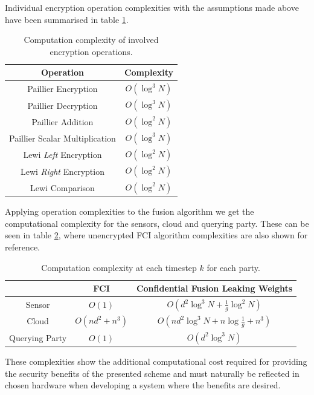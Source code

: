 Individual encryption operation complexities with the assumptions made above have been summarised in table \ref{tab:cloud_fusion:secfci_op_complexity}. 
\begin{table}[htbp]
    \centering
    \caption{Computation complexity of involved encryption operations.}
    \label{tab:cloud_fusion:secfci_op_complexity}
    \begin{tabular}{|c|c|}
        \hline
        \textbf{Operation} & \textbf{Complexity} \\ 
        \hline
        Paillier Encryption & $O(\log^3{N})$ \\ 
        Paillier Decryption & $O(\log^3{N})$ \\ 
        Paillier Addition & $O(\log^2{N})$ \\ 
        Paillier Scalar Multiplication & $O(\log^3{N})$ \\ 
        Lewi \textit{Left} Encryption & $O(\log^2{N})$ \\ 
        Lewi \textit{Right} Encryption & $O(\log^2{N})$ \\ 
        Lewi Comparison & $O(\log^2{N})$ \\ 
        \hline
    \end{tabular}
\end{table}
Applying operation complexities to the fusion algorithm we get the computational complexity for the sensors, cloud and querying party. These can be seen in table \ref{tab:cloud_fusion:secfci_complexity}, where unencrypted FCI algorithm complexities are also shown for reference. 
\begin{table}[htbp]
   \centering
   \caption{Computation complexity at each timestep $k$ for each party.}
   \label{tab:cloud_fusion:secfci_complexity}
   \begin{tabular}{|c|c|c|}
      \hline
       & \textbf{FCI} & \textbf{Confidential Fusion Leaking Weights} \\ 
      \hline
      Sensor & $O(1)$ & $O\left(d^2\log^3{N} + \frac{1}{g}\log^2{N}\right)$ \\ 
      Cloud & $O(nd^2+n^3)$ & $O\left(nd^2\log^3{N} + n\log{\frac{1}{g}} + n^3\right)$ \\ 
      Querying Party & $O(1)$ & $O\left(d^2\log^3{N}\right)$ \\ 
      \hline
   \end{tabular}
\end{table}
These complexities show the additional computational cost required for providing the security benefits of the presented scheme and must naturally be reflected in chosen hardware when developing a system where the benefits are desired.

